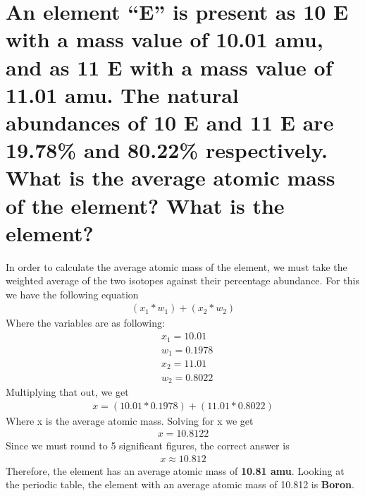 \documentclass[11pt]{article}
\begin{document}
\section{An element “E” is present as 10 E with a mass value of 10.01 amu, and as 11 E with a mass value of 11.01 amu. The natural abundances of 10 E and 11 E are 19.78\% and 80.22\% respectively. What is the average atomic mass of the element? What is the element?}
\label{sec:orgf299fae}
In order to calculate the average atomic mass of the element, we must take the
 weighted average of the two isotopes against their percentage abundance. For
 this we have the following equation
\begin{align*}
(x_1*w_1)+(x_2*w_2)
\end{align*}
Where the variables are as following:
\begin{align*}
&x_{1}=10.01\\
&w_{1}=0.1978\\
&x_{2}=11.01\\
&w_{2}=0.8022
\end{align*}
Multiplying that out, we get
\begin{align*}
x=(10.01*0.1978)+(11.01*0.8022)
\end{align*}
Where x is the average atomic mass. Solving for x we get
\begin{align*}
x=10.8122
\end{align*}
Since we must round to 5 significant figures, the correct answer is
\begin{align*}
x\approx10.812
\end{align*}
Therefore, the element has an average atomic mass of \textbf{10.81 amu}. Looking at the periodic table, the element with an average atomic mass of 10.812 is \textbf{Boron}.
\end{document}

